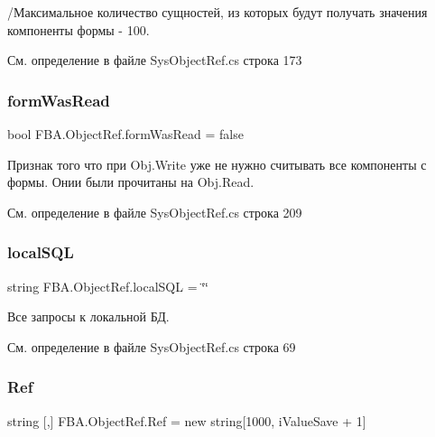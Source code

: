 /Максимальное количество сущностей, из которых будут получать значения компоненты формы -\/ 100. 



См. определение в файле Sys\+Object\+Ref.\+cs строка 173

\mbox{\label{class_f_b_a_1_1_object_ref_ac7b0d6511b85e206c9560e479f5470f1}} 
\subsubsection{\texorpdfstring{form\+Was\+Read}{formWasRead}}
{\footnotesize\ttfamily bool F\+B\+A.\+Object\+Ref.\+form\+Was\+Read = false}



Признак того что при Obj.\+Write уже не нужно считывать все компоненты с формы. Онии были прочитаны на Obj.\+Read. 



См. определение в файле Sys\+Object\+Ref.\+cs строка 209

\mbox{\label{class_f_b_a_1_1_object_ref_ae5b0fc12db21dfe4dc0a1f90deb5d5f2}} 
\subsubsection{\texorpdfstring{local\+S\+QL}{localSQL}}
{\footnotesize\ttfamily string F\+B\+A.\+Object\+Ref.\+local\+S\+QL = \char`\"{}\char`\"{}}



Все запросы к локальной БД. 



См. определение в файле Sys\+Object\+Ref.\+cs строка 69

\mbox{\label{class_f_b_a_1_1_object_ref_a7d512d347fad3d41e9a5c60ff8dd722b}} 
\subsubsection{\texorpdfstring{Ref}{Ref}}
{\footnotesize\ttfamily string \mbox{[},\mbox{]} F\+B\+A.\+Object\+Ref.\+Ref = new string\mbox{[}1000, i\+Value\+Save + 1\mbox{]}}



